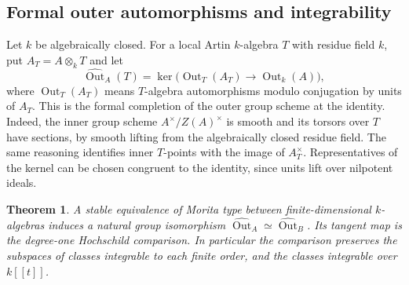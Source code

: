\documentclass[12pt,a4paper,english,reqno]{amsart}
\numberwithin{equation}{section}
\theoremstyle{plain}
\newtheorem{theorem}{Theorem}[section]
\theoremstyle{definition}
\begin{document}
\subsection{Formal outer automorphisms and integrability}

Let $k$ be algebraically closed. For a local Artin $k$-algebra $T$
with residue field $k$, put $A_T=A\otimes_k T$ and let
\[
 \widehat{\operatorname{Out}}_A(T)=
 \ker\bigl(\operatorname{Out}_T(A_T)\longrightarrow
                         \operatorname{Out}_k(A)\bigr),
\]
where $\operatorname{Out}_T(A_T)$ means $T$-algebra automorphisms
modulo conjugation by units of $A_T$. This is the formal completion
of the outer group scheme at the identity. Indeed, the inner group
scheme $A^\times/Z(A)^\times$ is smooth and its torsors over $T$
have sections, by smooth lifting from the algebraically closed
residue field. The same reasoning identifies inner $T$-points
with the image of $A_T^\times$. Representatives of the kernel
can be chosen congruent to the identity, since units lift over
nilpotent ideals.

\begin{theorem}\label{thm:formal-outer}
A stable equivalence of Morita type between finite-dimensional
$k$-algebras induces a natural group isomorphism
$\widehat{\operatorname{Out}}_A\simeq
 \widehat{\operatorname{Out}}_B$.
Its tangent map is the degree-one Hochschild comparison.
In particular the comparison preserves the subspaces of
classes integrable to each finite order, and the classes
integrable over $k[[t]]$.
\end{theorem}
\end{document}
